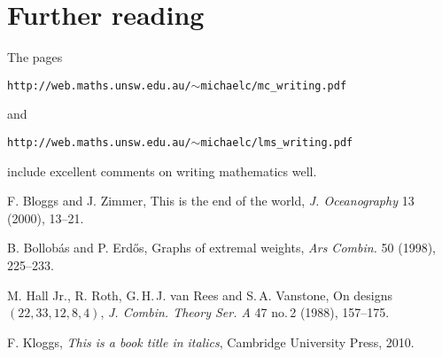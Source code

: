 \documentclass[12pt]{article}
\numberwithin{equation}{section}
\begin{document}
\section{Further reading}

The pages
\begin{center}
\tt http://web.maths.unsw.edu.au/$\sim$michaelc/mc\_writing.pdf
\end{center}
and
\begin{center}
\tt http://web.maths.unsw.edu.au/$\sim$michaelc/lms\_writing.pdf
\end{center}
include excellent comments on writing mathematics well.


\begin{thebibliography}{9}

F. Bloggs and J. Zimmer,
This is the end of the world,
{\em J. Oceanography} 13 (2000), 13--21.

B. Bollob\'as and P. Erd\H os,
Graphs of extremal weights,
{\em Ars Combin.} 50 (1998), 225--233.

M. Hall Jr., R. Roth, G.\,H.\,J. van Rees and S.\,A. Vanstone,
On designs $(22,33,12,8,4)$,
{\em J. Combin. Theory Ser. A} 47 no.\,2 (1988), 157--175.

F. Kloggs, {\it This is a book title in italics},
Cambridge University Press, 2010.

\end{thebibliography}
\end{document}
